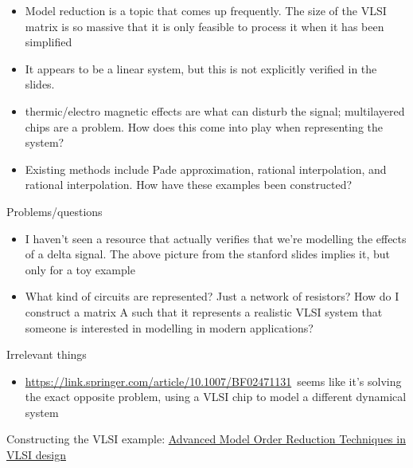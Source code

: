 \documentclass[
]{article}
\providecommand{\tightlist}{%
  \setlength{\itemsep}{0pt}\setlength{\parskip}{0pt}}
\begin{document}
\begin{itemize}
\tightlist
\item
  {Model reduction is a topic that comes up frequently. The size of the
  VLSI matrix is so massive that it is only feasible to process it when
  it has been simplified}
\item
  It appears to be a linear system, but this is not explicitly verified
  in the slides.
\item
  thermic/electro magnetic effects are what can disturb the signal;
  multilayered chips are a problem. How does this come into play 
  when representing the system?
\item
  Existing methods include Pade approximation, rational interpolation, 
  and rational interpolation. How have these examples been constructed?
\end{itemize}

{Problems/questions}

\begin{itemize}
\tightlist
\item
  {I haven't seen a resource that actually verifies that we're modelling
  the effects of a delta signal. The above picture from the stanford
  slides implies it, but only for a toy example}
\item
  {What kind of circuits are represented? Just a network of resistors?
  How do I construct a matrix A such that it represents a realistic VLSI
  system that someone is interested in modelling in modern
  applications?}
\end{itemize}

{}

{Irrelevant things}

\begin{itemize}
\tightlist
\item
  {\href{https://www.google.com/url?q=https://link.springer.com/article/10.1007/BF02471131\&sa=D\&ust=1575490230669000}{https://link.springer.com/article/10.1007/BF02471131}}{~seems
  like it's solving the exact opposite problem, using a VLSI chip to
  model a different dynamical system}
\end{itemize}

Constructing the VLSI example: {\href{https://www.cambridge.org/core/books/advanced-model-order-reduction-techniques-in-vlsi-design/F028638D140242588A7BF8AE5EA26F59}{Advanced Model Order Reduction Techniques in VLSI design}}
\end{document}
